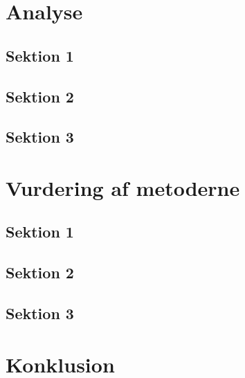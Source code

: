 \documentclass[11pt,a4paper,twoside,openright,danish]{book}
\theoremstyle{definition}
\begin{document}
\chapter{Analyse}
\section{Sektion 1}

\section{Sektion 2}

\section{Sektion 3}

\chapter{Vurdering af metoderne}
\section{Sektion 1}

\section{Sektion 2}

\section{Sektion 3}

\chapter{Konklusion}

% 
% 

\begin{appendices}
\end{appendices}

\backmatter



\end{document}

